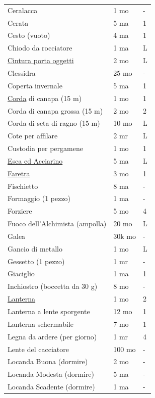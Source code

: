 \begin{multicols}{2}
\begin{tabular}{p{5cm}p{1.5cm}p{0.7cm}}
\rowcolor{gray!20}Ceralacca & 1 mo & - \\
Cerata & 5 ma & 1 \\
\rowcolor{gray!20}Cesto (vuoto) & 4 ma & 1 \\
Chiodo da rocciatore & 1 ma & L \\
\rowcolor{gray!20}\hyperlink{Cintura porta oggetti}{Cintura porta oggetti} & 2 mo & L \\
Clessidra & 25 mo & - \\
\rowcolor{gray!20}Coperta invernale & 5 ma & 1 \\
\hyperlink{Corda}{Corda} di canapa (15 m) & 1 mo & 1 \\
\rowcolor{gray!20}Corda di canapa grossa (15 m) & 2 mo & 2 \\
Corda di seta di ragno (15 m) & 10 mo & L \\
\rowcolor{gray!20}Cote per affilare & 2 mr & L \\
Custodia per pergamene & 1 mo & 1 \\
\rowcolor{gray!20}\hyperlink{Esca ed Acciarino}{Esca ed Acciarino} & 5 ma & L \\
\hyperlink{Faretra}{Faretra} & 3 mo & 1 \\
\rowcolor{gray!20}Fischietto & 8 ma & - \\
Formaggio (1 pezzo) & 1 ma & - \\
\rowcolor{gray!20}Forziere & 5 mo & 4 \\
Fuoco dell'Alchimista (ampolla) & 20 mo & L \\
\rowcolor{gray!20}Galea & 30k mo & - \\
Gancio di metallo & 1 mo & L \\
\rowcolor{gray!20}Gessetto (1 pezzo) & 1 mr & - \\
Giaciglio & 1 ma & 1 \\
\rowcolor{gray!20}Inchiostro (boccetta da 30 g) & 8 mo & - \\
\hyperlink{Lanterna}{Lanterna} & 1 mo & 2 \\
\rowcolor{gray!20}Lanterna a lente sporgente & 12 mo & 1 \\
Lanterna schermabile & 7 mo & 1 \\
\rowcolor{gray!20}Legna da ardere (per giorno) & 1 mr & 4 \\
Lente del cacciatore & 100 mo & - \\
\rowcolor{gray!20}Locanda Buona (dormire) & 2 mo & - \\
Locanda Modesta (dormire) & 5 ma & - \\
\rowcolor{gray!20}Locanda Scadente (dormire) & 1 ma & - \\

\end{tabular}
\end{multicols}
